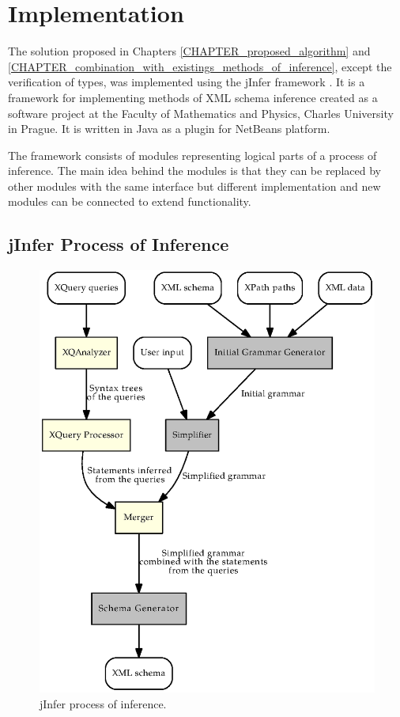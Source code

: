 \chapter{Implementation}
The solution proposed in Chapters \ref{CHAPTER_proposed_algorithm} and \ref{CHAPTER_combination_with_existings_methods_of_inference}, except the verification of types, was implemented using the jInfer framework \cite{jinfer}. It is a framework for implementing methods of XML schema inference created as a software project at the Faculty of Mathematics and Physics, Charles University in Prague. It is written in Java as a plugin for NetBeans platform.

The framework consists of modules representing logical parts of a process of inference. The main idea behind the modules is that they can be replaced by other modules with the same interface but different implementation and new modules can be connected to extend functionality.

\section{jInfer Process of Inference}
\begin{figure}
\includegraphics[scale=0.9]{jinfer_steps.eps}
\caption{jInfer process of inference.}
\label{FIG_jinfer_steps}
\end{figure}

